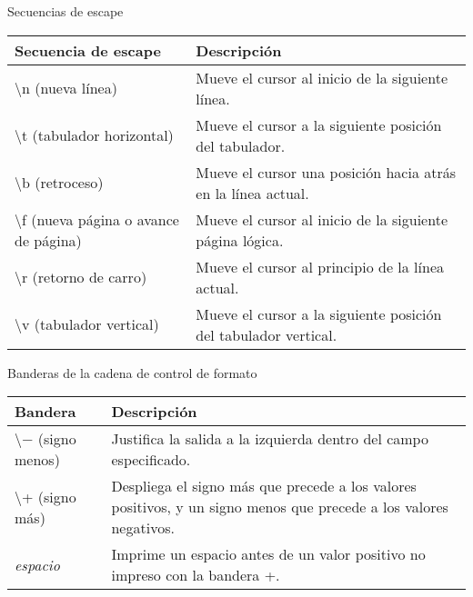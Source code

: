 \begin{frame}[t]{Secuencias de escape}
\small
\begin{center}
	\begin{tabular}{lp{6cm}}
		\toprule
		\textbf{Secuencia de escape} & \textbf{Descripción}\\
		\midrule
		\textbackslash n (nueva l\'inea) & Mueve el cursor al inicio de la siguiente l\'inea.\\ 
		\textbackslash t (tabulador horizontal) & Mueve el cursor a la siguiente posición del tabulador.\\
		\textbackslash b (retroceso) & Mueve el cursor una posición hacia atrás en la línea actual.\\
		\textbackslash f (nueva página o avance de página) & Mueve el cursor al inicio de la siguiente página l\'ogica.\\
		\textbackslash r (retorno de carro) & Mueve el cursor al principio de la línea actual.\\
		\textbackslash v (tabulador vertical) & Mueve el cursor a la siguiente posición del tabulador vertical.\\
		\bottomrule
	\end{tabular}
\end{center}
\end{frame}

\begin{frame}[t]{Banderas de la cadena de control de formato}
\small
\centering
\begin{tabular}{lp{6cm}}
	\toprule
	\textbf{Bandera} & \textbf{Descripción}\\
	\midrule
	\textbackslash$-$ (signo menos) & Justifica la salida a la izquierda dentro del campo especificado.\\
	\textbackslash+ (signo más) & Despliega el signo más que precede a los valores positivos, y un signo menos que precede a los valores negativos.\\
	\textit{espacio} & Imprime un espacio antes de un valor positivo no impreso con la bandera +.\\
	\bottomrule
\end{tabular}
\end{frame}


